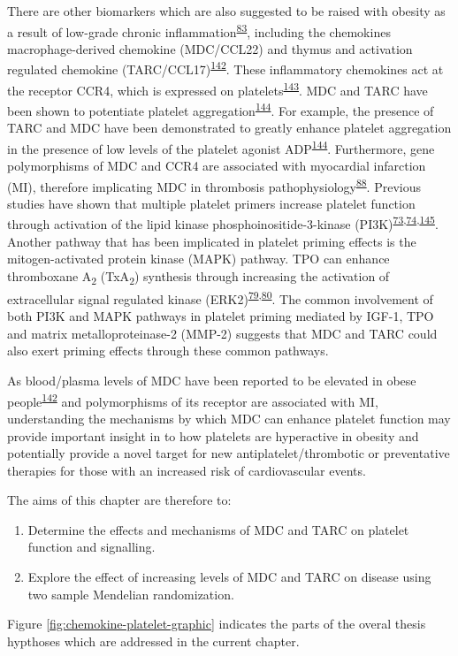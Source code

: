 \documentclass[11pt,twoside]{bristolthesis}
\providecommand{\tightlist}{%
  \setlength{\itemsep}{0pt}\setlength{\parskip}{0pt}}
\begin{document}
There are other biomarkers which are also suggested to be raised with obesity as a result of low-grade chronic inflammation\textsuperscript{\protect\hyperlink{ref-Esser2014}{83}}, including the chemokines macrophage-derived chemokine (MDC/CCL22) and thymus and activation regulated chemokine (TARC/CCL17)\textsuperscript{\protect\hyperlink{ref-Safa2016}{142}}. These inflammatory chemokines act at the receptor CCR4, which is expressed on platelets\textsuperscript{\protect\hyperlink{ref-Clemetson2000}{143}}. MDC and TARC have been shown to potentiate platelet aggregation\textsuperscript{\protect\hyperlink{ref-Gear2001}{144}}. For example, the presence of TARC and MDC have been demonstrated to greatly enhance platelet aggregation in the presence of low levels of the platelet agonist ADP\textsuperscript{\protect\hyperlink{ref-Gear2001}{144}}. Furthermore, gene polymorphisms of MDC and CCR4 are associated with myocardial infarction (MI), therefore implicating MDC in thrombosis pathophysiology\textsuperscript{\protect\hyperlink{ref-Noori2018}{88}}. Previous studies have shown that multiple platelet primers increase platelet function through activation of the lipid kinase phosphoinositide-3-kinase (PI3K)\textsuperscript{\protect\hyperlink{ref-Blair2015}{73},\protect\hyperlink{ref-Pasquet2000}{74},\protect\hyperlink{ref-Falcinelli2005}{145}}. Another pathway that has been implicated in platelet priming effects is the mitogen-activated protein kinase (MAPK) pathway. TPO can enhance thromboxane A\textsubscript{2} (TxA\textsubscript{2}) synthesis through increasing the activation of extracellular signal regulated kinase (ERK2)\textsuperscript{\protect\hyperlink{ref-Ezumi1998}{79},\protect\hyperlink{ref-VanWilligen2000}{80}}. The common involvement of both PI3K and MAPK pathways in platelet priming mediated by IGF-1, TPO and matrix metalloproteinase-2 (MMP-2) suggests that MDC and TARC could also exert priming effects through these common pathways.

As blood/plasma levels of MDC have been reported to be elevated in obese people\textsuperscript{\protect\hyperlink{ref-Safa2016}{142}} and polymorphisms of its receptor are associated with MI, understanding the mechanisms by which MDC can enhance platelet function may provide important insight in to how platelets are hyperactive in obesity and potentially provide a novel target for new antiplatelet/thrombotic or preventative therapies for those with an increased risk of cardiovascular events.

The aims of this chapter are therefore to:
\begin{enumerate}
\def\labelenumi{\arabic{enumi})}
\tightlist
\item
  Determine the effects and mechanisms of MDC and TARC on platelet function and signalling.
\item
  Explore the effect of increasing levels of MDC and TARC on disease using two sample Mendelian randomization.
\end{enumerate}
Figure \ref{fig:chemokine-platelet-graphic} indicates the parts of the overal thesis hypthoses which are addressed in the current chapter.
\end{document}
